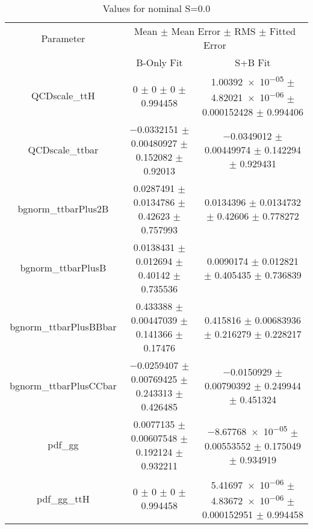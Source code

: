 \begin{table}
\centering
\caption{Values for nominal S=0.0}
\begin{tabular}{ccc}
\toprule
Parameter & \multicolumn{2}{c}{Mean $\pm$ Mean Error $\pm$ RMS $\pm$ Fitted Error}\\
 & B-Only Fit & S+B Fit\\
\midrule
QCDscale\_ttH & \num{0} $\pm$ \num{0} $\pm$ \num{0} $\pm$ \num{0.994458} & \num{1.00392e-05} $\pm$ \num{4.82021e-06} $\pm$ \num{0.000152428} $\pm$ \num{0.994406}\\
QCDscale\_ttbar & \num{-0.0332151} $\pm$ \num{0.00480927} $\pm$ \num{0.152082} $\pm$ \num{0.92013} & \num{-0.0349012} $\pm$ \num{0.00449974} $\pm$ \num{0.142294} $\pm$ \num{0.929431}\\
bgnorm\_ttbarPlus2B & \num{0.0287491} $\pm$ \num{0.0134786} $\pm$ \num{0.42623} $\pm$ \num{0.757993} & \num{0.0134396} $\pm$ \num{0.0134732} $\pm$ \num{0.42606} $\pm$ \num{0.778272}\\
bgnorm\_ttbarPlusB & \num{0.0138431} $\pm$ \num{0.012694} $\pm$ \num{0.40142} $\pm$ \num{0.735536} & \num{0.0090174} $\pm$ \num{0.012821} $\pm$ \num{0.405435} $\pm$ \num{0.736839}\\
bgnorm\_ttbarPlusBBbar & \num{0.433388} $\pm$ \num{0.00447039} $\pm$ \num{0.141366} $\pm$ \num{0.17476} & \num{0.415816} $\pm$ \num{0.00683936} $\pm$ \num{0.216279} $\pm$ \num{0.228217}\\
bgnorm\_ttbarPlusCCbar & \num{-0.0259407} $\pm$ \num{0.00769425} $\pm$ \num{0.243313} $\pm$ \num{0.426485} & \num{-0.0150929} $\pm$ \num{0.00790392} $\pm$ \num{0.249944} $\pm$ \num{0.451324}\\
pdf\_gg & \num{0.0077135} $\pm$ \num{0.00607548} $\pm$ \num{0.192124} $\pm$ \num{0.932211} & \num{-8.67768e-05} $\pm$ \num{0.00553552} $\pm$ \num{0.175049} $\pm$ \num{0.934919}\\
pdf\_gg\_ttH & \num{0} $\pm$ \num{0} $\pm$ \num{0} $\pm$ \num{0.994458} & \num{5.41697e-06} $\pm$ \num{4.83672e-06} $\pm$ \num{0.000152951} $\pm$ \num{0.994458}\\
\bottomrule
\end{tabular}
\end{table}